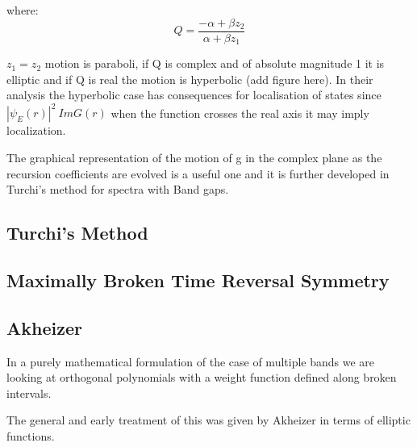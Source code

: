 where:
%
\begin{equation}
Q = \frac{-\alpha +\beta z_{2}}{\alpha + \beta z_{1}}
\end{equation}

$z_1=z_2$ motion is paraboli, if Q is complex and of absolute magnitude 1 it 
is elliptic and if Q is real the motion is hyperbolic (add figure here). 
In their analysis the hyperbolic case has consequences for localisation of states
since $|\psi_{E}(r)|^{2} ~ Im G(r)$ when the function crosses the real axis it 
may imply localization.

The graphical representation of the motion of g in the complex plane as the 
recursion coefficients are evolved is a useful one and it is further developed
in Turchi's method for spectra with Band gaps.

\subsection{Turchi's Method}

\subsection{Maximally Broken Time Reversal Symmetry}

\subsection{Akheizer}
In a purely mathematical formulation of the case of 
multiple bands we are looking at orthogonal polynomials
with a weight function defined along broken intervals. 

The general and early treatment of this was given by Akheizer
in terms of elliptic functions.


